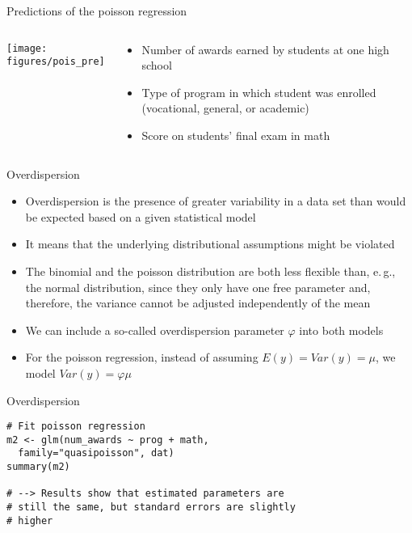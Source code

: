 \documentclass[aspectratio=169]{beamer}
\begin{document}
\begin{frame}{Predictions of the poisson regression}
\begin{columns}[c]
\begin{column}{6cm}
  \texttt{[image: figures/pois\_pre]}
\end{column}
\begin{column}{5cm}
  \begin{itemize}
    \item Number of awards earned by students at one high school
    \item Type of program in which student was enrolled (vocational,
    general, or academic)
    \item Score on students' final exam in math
  \end{itemize}
\end{column}
\end{columns}
\end{frame}

\begin{frame}{Overdispersion}
  \begin{itemize}
    \item Overdispersion is the presence of greater variability in a data
      set than would be expected based on a given statistical model
    \item It means that the underlying distributional assumptions might be
      violated
    \item The binomial and the poisson distribution are both less flexible
      than, e.\,g., the normal distribution, since they only have one free
      parameter and, therefore, the variance cannot be adjusted
      independently of the mean
    \item We can include a so-called overdispersion parameter $\varphi$
      into both models
    \item For the poisson regression, instead of assuming $E(y) = Var(y) =
      \mu$, we model $Var(y) = \varphi\mu$
  \end{itemize}
\end{frame}

{

\begin{frame}[fragile]{Overdispersion}
\begin{lstlisting}
# Fit poisson regression
m2 <- glm(num_awards ~ prog + math, 
  family="quasipoisson", dat)
summary(m2)

# --> Results show that estimated parameters are
# still the same, but standard errors are slightly
# higher
\end{lstlisting}
\end{frame}

}
\end{document}
